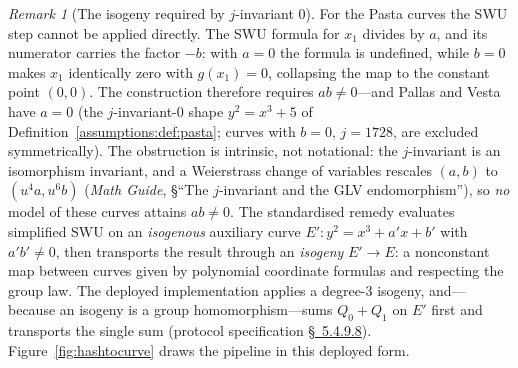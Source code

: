 \documentclass[11pt,a4paper]{article}
\theoremstyle{definition}
\theoremstyle{remark}
\newtheorem{remark}[theorem]{Remark}
\begin{document}
\begin{remark}[The isogeny required by \(j\)-invariant \(0\)]
\label{hash:rem:isogeny}
For the Pasta curves the SWU step cannot be applied directly. The
SWU formula for
\(x_{1}\) divides by \(a\), and its numerator carries the factor
\(-b\): with \(a = 0\) the formula is undefined, while \(b = 0\)
makes \(x_{1}\) identically zero with \(g(x_{1}) = 0\), collapsing
the map to the constant point \((0, 0)\). The construction therefore
requires \(ab \neq 0\)---and Pallas and Vesta have \(a = 0\) (the
\(j\)-invariant-\(0\) shape \(y^{2} = x^{3} + 5\) of
Definition~\ref{assumptions:def:pasta}; curves with \(b = 0\),
\(j = 1728\), are excluded symmetrically). The obstruction is
intrinsic, not notational: the \(j\)-invariant is an isomorphism
invariant, and a Weierstrass change of variables rescales
\((a, b)\) to \((u^{4}a, u^{6}b)\) (\emph{Math Guide}, \S``The
\(j\)-invariant and the GLV endomorphism''), so \emph{no} model of
these curves attains \(ab \neq 0\). The standardised remedy evaluates
simplified SWU on an \emph{isogenous} auxiliary curve
\(E' \colon y^{2} = x^{3} + a'x + b'\) with \(a'b' \neq 0\), then
transports the result through an \emph{isogeny}
\(E' \to E\): a nonconstant map between curves given by polynomial
coordinate formulas and respecting the group law. The deployed
implementation applies a degree-\(3\) isogeny, and---because an
isogeny is a group homomorphism---sums \(Q_{0} + Q_{1}\) on \(E'\)
first and transports the single sum
(protocol specification
\href{https://zips.z.cash/protocol/protocol.pdf\#concretegrouphashpallasandvesta}{\S~5.4.9.8}).
Figure~\ref{fig:hashtocurve} draws the pipeline in this deployed form.
\end{remark}
\end{document}
